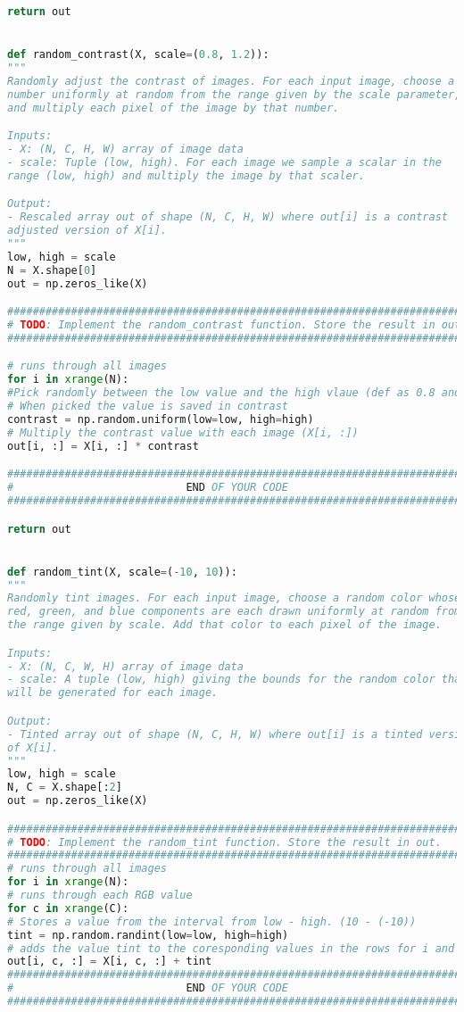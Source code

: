 \begin{lstlisting}[language=Python, label=lst:data_augmentation.py, caption={dataaug.py}, basicstyle=\tiny]
return out


def random_contrast(X, scale=(0.8, 1.2)):
"""
Randomly adjust the contrast of images. For each input image, choose a
number uniformly at random from the range given by the scale parameter,
and multiply each pixel of the image by that number.

Inputs:
- X: (N, C, H, W) array of image data
- scale: Tuple (low, high). For each image we sample a scalar in the
range (low, high) and multiply the image by that scaler.

Output:
- Rescaled array out of shape (N, C, H, W) where out[i] is a contrast
adjusted version of X[i].
"""
low, high = scale
N = X.shape[0]
out = np.zeros_like(X)

#############################################################################
# TODO: Implement the random_contrast function. Store the result in out.    #
#############################################################################

# runs through all images
for i in xrange(N):
#Pick randomly between the low value and the high vlaue (def as 0.8 and 1.2 in line 77)
# When picked the value is saved in contrast
contrast = np.random.uniform(low=low, high=high)
# Multiply the contrast value with each image (X[i, :])
out[i, :] = X[i, :] * contrast

#############################################################################
#                           END OF YOUR CODE                                #
#############################################################################

return out


def random_tint(X, scale=(-10, 10)):
"""
Randomly tint images. For each input image, choose a random color whose
red, green, and blue components are each drawn uniformly at random from
the range given by scale. Add that color to each pixel of the image.

Inputs:
- X: (N, C, W, H) array of image data
- scale: A tuple (low, high) giving the bounds for the random color that
will be generated for each image.

Output:
- Tinted array out of shape (N, C, H, W) where out[i] is a tinted version
of X[i].
"""
low, high = scale
N, C = X.shape[:2]
out = np.zeros_like(X)

#############################################################################
# TODO: Implement the random_tint function. Store the result in out.        #
#############################################################################
# runs through all images
for i in xrange(N):
# runs through each RGB value
for c in xrange(C):
# Stores a value from the interval from low - high. (10 - (-10))
tint = np.random.randint(low=low, high=high)
# adds the value tint to the coresponding values in the rows for i and c.
out[i, c, :] = X[i, c, :] + tint
#############################################################################
#                           END OF YOUR CODE                                #
#############################################################################


\end{lstlisting}
